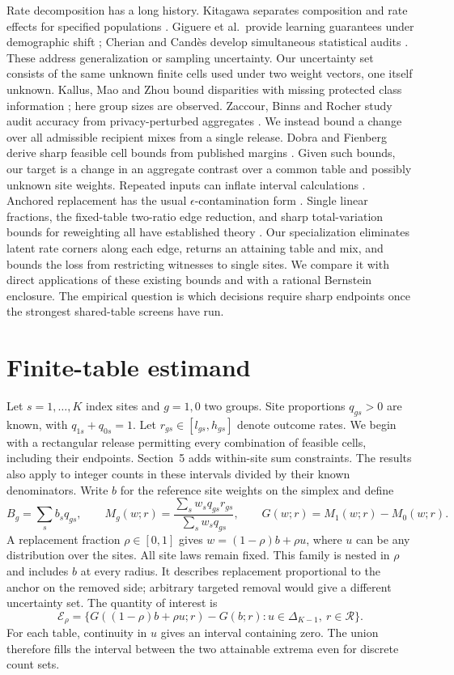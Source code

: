 \documentclass[11pt]{article}
\newcommand{\E}{\mathcal{E}}
\newcommand{\R}{\mathcal{R}}
\newcommand{\dd}{\Delta}
\begin{document}
Rate decomposition has a long history. Kitagawa separates composition and rate effects for specified populations \cite{kitagawa}. Giguere et al.\ provide learning guarantees under demographic shift \cite{giguere}; Cherian and Cand\`es develop simultaneous statistical audits \cite{cherian}. These address generalization or sampling uncertainty. Our uncertainty set consists of the same unknown finite cells used under two weight vectors, one itself unknown. Kallus, Mao and Zhou bound disparities with missing protected class information \cite{kallus}; here group sizes are observed. Zaccour, Binns and Rocher study audit accuracy from privacy-perturbed aggregates \cite{zaccour}. We instead bound a change over all admissible recipient mixes from a single release. Dobra and Fienberg derive sharp feasible cell bounds from published margins \cite{dobra}. Given such bounds, our target is a change in an aggregate contrast over a common table and possibly unknown site weights. Repeated inputs can inflate interval calculations \cite{interval}. Anchored replacement has the usual $\epsilon$-contamination form \cite{berger}. Single linear fractions, the fixed-table two-ratio edge reduction, and sharp total-variation bounds for reweighting all have established theory \cite{charnes,cambini,cohen}. Our specialization eliminates latent rate corners along each edge, returns an attaining table and mix, and bounds the loss from restricting witnesses to single sites. We compare it with direct applications of these existing bounds and with a rational Bernstein enclosure. The empirical question is which decisions require sharp endpoints once the strongest shared-table screens have run.

\section{Finite-table estimand}
Let $s=1,\dots,K$ index sites and $g=1,0$ two groups. Site proportions $q_{gs}>0$ are known, with $q_{1s}+q_{0s}=1$. Let $r_{gs}\in[l_{gs},h_{gs}]$ denote outcome rates. We begin with a rectangular release permitting every combination of feasible cells, including their endpoints. Section~5 adds within-site sum constraints. The results also apply to integer counts in these intervals divided by their known denominators. Write $b$ for the reference site weights on the simplex and define
\[
 B_g=\sum_s b_s q_{gs},\qquad
 M_g(w;r)=\frac{\sum_s w_s q_{gs}r_{gs}}{\sum_s w_s q_{gs}},\qquad
 G(w;r)=M_1(w;r)-M_0(w;r).
\]
A replacement fraction $\rho\in[0,1]$ gives $w=(1-\rho)b+\rho u$, where $u$ can be any distribution over the sites. All site laws remain fixed. This family is nested in $\rho$ and includes $b$ at every radius. It describes replacement proportional to the anchor on the removed side; arbitrary targeted removal would give a different uncertainty set. The quantity of interest is
\[
 \E_\rho=\{G((1-\rho)b+\rho u;r)-G(b;r): u\in\dd_{K-1},\ r\in\R\}.
\]
For each table, continuity in $u$ gives an interval containing zero. The union therefore fills the interval between the two attainable extrema even for discrete count sets.
\end{document}
